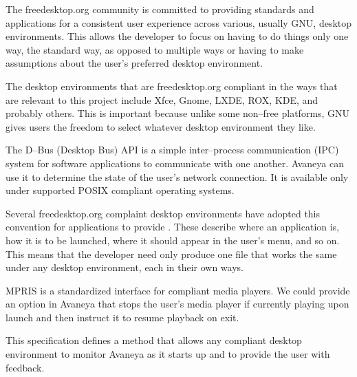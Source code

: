 

The freedesktop.org community is committed to providing standards and applications for a consistent user experience across various, usually GNU, desktop environments. This allows the developer to focus on having to do things only one way, the standard way, as opposed to multiple ways or having to make assumptions about the user's preferred desktop environment. 

The desktop environments that are freedesktop.org compliant in the ways that are relevant to this project include Xfce, Gnome, LXDE, ROX, KDE, and probably others. This is important because unlike some non--free platforms, GNU gives users the freedom to select whatever desktop environment they like.

\startitemize[4]

The D--Bus (Desktop Bus) API is a simple inter--process communication (IPC) system for software applications to communicate with one another. Avaneya can use it to determine the state of the user's network connection. It is available only under supported POSIX compliant operating systems.


Several freedesktop.org complaint desktop environments have adopted this convention for applications to provide . These describe where an application is, how it is to be launched, where it should appear in the user's menu, and so on. This means that the developer need only produce one file that works the same under any desktop environment, each in their own ways.


MPRIS is a standardized interface for compliant media players. We could provide an option in Avaneya that stops the user's media player if currently playing upon launch and then instruct it to resume playback on exit.


This specification defines a method that allows any compliant desktop environment to monitor Avaneya as it starts up and to provide the user with feedback.
\stopitemize


